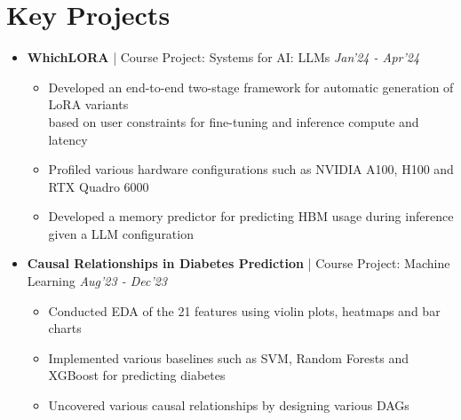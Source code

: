 \documentclass[10pt,letterpaper,sans]{moderncv}
\providecommand{\sl}{\slshape}
\begin{document}
\section{Key Projects}
\begin{itemize}
\item \textbf{WhichLORA} | Course Project: Systems for AI: LLMs \hfill{\sl  Jan'24 - Apr'24}\\
\vspace{-12pt}
\begin{itemize}
\item Developed an end-to-end two-stage framework for automatic generation of LoRA variants \\ based on user constraints for fine-tuning and inference compute and latency
\item Profiled various hardware configurations such as NVIDIA A100, H100 and RTX Quadro 6000
\item Developed a memory predictor for predicting HBM usage during inference given a LLM configuration
\end{itemize}
\vspace{5pt}

\item \textbf{Causal Relationships in Diabetes Prediction} | Course Project: Machine Learning \hfill{\sl  Aug'23 - Dec'23}\\
\vspace{-12pt}
\begin{itemize}
\item Conducted EDA of the 21 features using violin plots, heatmaps and bar charts
\item Implemented various baselines such as SVM, Random Forests and XGBoost for predicting diabetes
\item Uncovered various causal relationships by designing various DAGs
\end{itemize}
\vspace{5pt}


\end{itemize}
\end{document}
